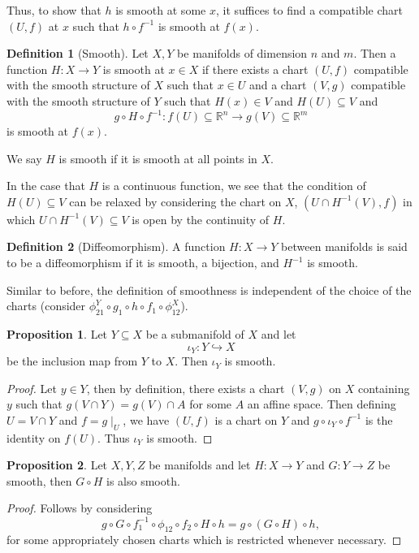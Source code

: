 \documentclass[]{article}
\theoremstyle{definition}
\theoremstyle{definition}
\newtheorem{definition}{Definition}[section]
\newtheorem{proposition}{Proposition}[section]
\begin{document}
Thus, to show that \(h\) is smooth at some \(x\), it suffices to find a compatible 
chart \((U, f)\) at \(x\) such that \(h \circ f^{-1}\) is smooth at \(f(x)\).

\begin{definition}[Smooth]
  Let \(X, Y\) be manifolds of dimension \(n\) and \(m\). Then a function 
  \(H : X \to Y\) is smooth at \(x \in X\) if there exists a chart 
  \((U, f)\) compatible with the smooth structure of \(X\) such that \(x \in U\) 
  and a chart \((V, g)\) compatible with the smooth structure of \(Y\) such that 
  \(H(x) \in V\) and \(H(U) \subseteq V\) and
  \[g \circ H \circ f^{-1} : f(U) \subseteq \mathbb{R}^n \to g(V) 
    \subseteq \mathbb{R}^m\]
  is smooth at \(f(x)\).

  We say \(H\) is smooth if it is smooth at all points in \(X\).
\end{definition}

In the case that \(H\) is a continuous function, we see that the condition of 
\(H(U) \subseteq V\) can be relaxed by considering the chart on \(X\), 
\((U \cap H^{-1}(V), f)\) in which \(U \cap H^{-1}(V) \subseteq V\) is open 
by the continuity of \(H\).

\begin{definition}[Diffeomorphism]
  A function \(H : X \to Y\) between manifolds is said to be a diffeomorphism 
  if it is smooth, a bijection, and \(H^{-1}\) is smooth.
\end{definition}

Similar to before, the definition of smoothness is independent of the choice 
of the charts (consider \(\phi^Y_{21} \circ g_1 \circ h \circ f_1 \circ \phi^X_{12}\)).

\begin{proposition}
  Let \(Y \subseteq X\) be a submanifold of \(X\) and let 
  \[\iota_Y : Y \hookrightarrow X\]
  be the inclusion map from \(Y\) to \(X\). Then \(\iota_Y\) is smooth.
\end{proposition}
\begin{proof}
  Let \(y \in Y\), then by definition, there exists a chart \((V, g)\) on 
  \(X\) containing \(y\) such that \(g(V \cap Y) = g(V) \cap A\) for some 
  \(A\) an affine space. Then defining \(U = V \cap Y\) and \(f = g\mid_U\), 
  we have \((U, f)\) is a chart on \(Y\) and \(g \circ \iota_Y \circ f^{-1}\) 
  is the identity on \(f(U)\). Thus \(\iota_Y\) is smooth.
\end{proof}

\begin{proposition}
  Let \(X, Y, Z\) be manifolds and let \(H : X \to Y\) and \(G : Y \to Z\) be
  smooth, then \(G \circ H\) is also smooth.
\end{proposition}
\begin{proof}
  Follows by considering 
  \[g \circ G \circ f_1^{-1} \circ \phi_{12} \circ f_2 \circ H \circ h = 
    g \circ (G \circ H) \circ h,\]
  for some appropriately chosen charts which is restricted whenever necessary. 
\end{proof}
\end{document}
